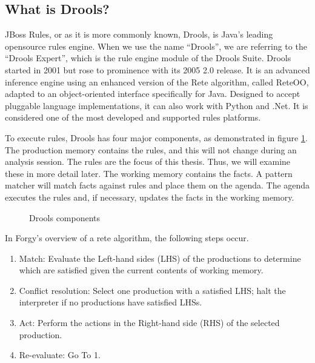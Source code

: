 \subsection{What is Drools?}\label{section:WhatIsDrools}

JBoss Rules, or as it is more commonly known, Drools, is Java's leading opensource rules engine.
When we use the name ``Drools'', we are referring to the ``Drools Expert'', which is the rule engine module of the Drools Suite.
Drools started in 2001 but rose to prominence with its 2005 2.0 release.
It is an advanced inference engine using an enhanced version of the Rete algorithm, called Rete\-OO\cite{sottara2010configurable}, adapted to an object-oriented interface specifically for Java.
Designed to accept pluggable language implementations, it can also work with Python and .Net.
It is considered one of the most developed and supported rules platforms.

To execute rules, Drools has four major components, as demonstrated in figure \ref{fig:Drools_components}.
The production memory contains the rules, and this will not change during an analysis session.
The rules are the focus of this thesis. 
Thus, we will examine these in more detail later.
The working memory contains the facts.
A pattern matcher will match facts against rules and place them on the agenda.
The agenda executes the rules and, if necessary, updates the facts in the working memory.

\begin{figure}[h]
    \centering
    \caption{Drools components}
    \label{fig:Drools_components}
\end{figure}

In Forgy's\cite{forgy1989rete} overview of a rete algorithm, the following steps occur.
\begin{enumerate}
    \setlength\itemsep{0em}
    \item Match: Evaluate the Left-hand sides (LHS) of the productions to determine which are satisfied given the current contents of working memory.
    \item Conflict resolution: Select one production with a satisfied LHS; halt the interpreter if no productions have satisfied LHSs.
    \item Act: Perform the actions in the Right-hand side (RHS) of the selected production.
    \item Re-evaluate: Go To 1.
\end{enumerate}

